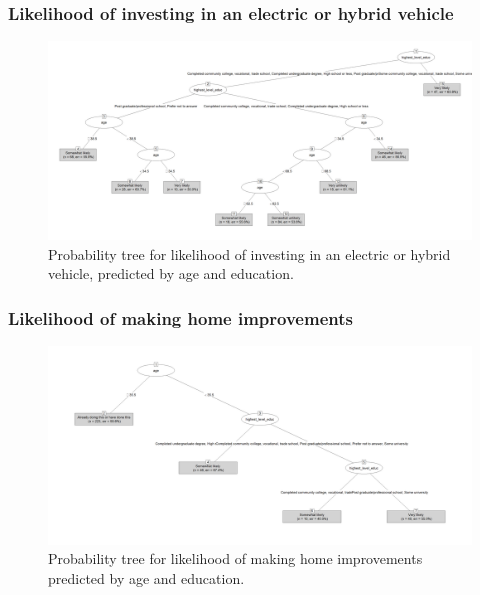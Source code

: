 \documentclass[
  letterpaper,
  DIV=11,
  numbers=noendperiod]{scrartcl}
\begin{document}
\subsubsection{Likelihood of investing in an electric or hybrid
vehicle}\label{likelihood-of-investing-in-an-electric-or-hybrid-vehicle}

\begin{figure}[H]

{\centering \includegraphics[width=10.67in,height=\textheight]{../data/04-model_data/vehicle_electric_tree.png}

}

\caption{Probability tree for likelihood of investing in an electric or
hybrid vehicle, predicted by age and education.}

\end{figure}%

\subsubsection{Likelihood of making home
improvements}\label{likelihood-of-making-home-improvements}

\begin{figure}[H]

{\centering \includegraphics[width=10.67in,height=\textheight]{../data/04-model_data/home_improvement_tree.png}

}

\caption{Probability tree for likelihood of making home improvements
predicted by age and education.}

\end{figure}%
\end{document}
